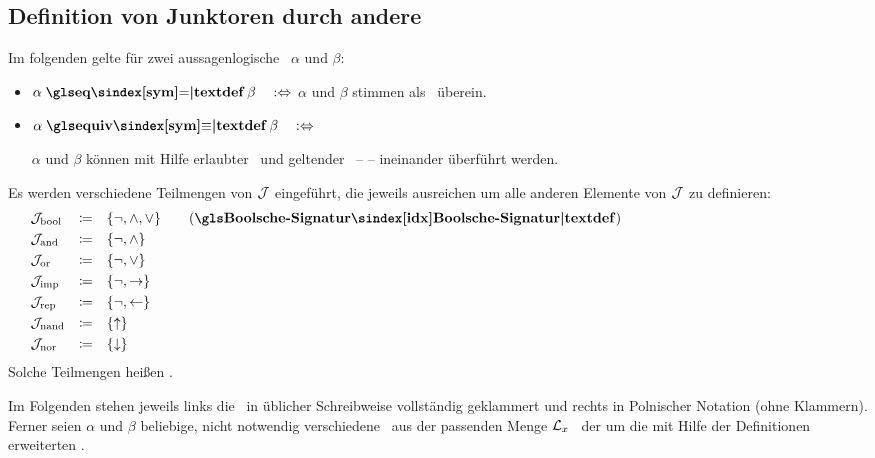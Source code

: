 \subsection{Definition von Junktoren durch andere}%
\label{sub:ausJunktorDef}

Im folgenden gelte für zwei aussagenlogische \Formeln\ $\alpha$ und $\beta$:
\begin{itemize}
	\item[] $\alpha \opdefinition{\symeq}    \beta \quad \metadefeq$ \quad $\alpha$ und $\beta$
	stimmen als \Zeichenkette\ überein.
	\item[] $\alpha \opdefinition{\symequiv} \beta \quad \metadefeq$ \quad
	\parbox[t]{13cm}{$\alpha$ und $\beta$ können mit Hilfe erlaubter \Substitutionen\ und geltender \Axiome\ --  -- ineinander überführt werden.}
\end{itemize}

Es werden verschiedene Teilmengen von $\mathcal{J}$ eingeführt, die jeweils ausreichen um alle anderen Elemente von $\mathcal{J}$ zu definieren:
\begin{align}
	& \alJun_\iBool & \defeq \quad & \{ \lnot, \land, \lor \} \label{def:Jbool}
	\qquad \text{(\definition{\BoolscheSignatur})}
	\\
	& \alJun_\iAnd  & \defeq \quad & \{ \lnot, \land       \} \label{def:Jand}
	\\
	& \alJun_\iOr   & \defeq \quad & \{ \lnot, \lor        \} \label{def:Jor}
	\\
	& \alJun_\iImp  & \defeq \quad & \{ \lnot, \limp       \} \label{def:Jimp}
	\\
	& \alJun_\iRep  & \defeq \quad & \{ \lnot, \lrep       \} \label{def:Jrep}
	\\
	& \alJun_\iNand & \defeq \quad & \{ \lnand             \} \label{def:Jnand}
	\\
	& \alJun_\iNor  & \defeq \quad & \{ \lnor              \} \label{def:Jnor}
	\formulatoleft\formulatoleft\formulatoleft
\end{align}
Solche Teilmengen heißen \logischeSignatur.

Im Folgenden stehen jeweils links die \Formeln\ in üblicher Schreibweise vollständig geklammert und rechts in Polnischer Notation (ohne Klammern).
Ferner seien $\alpha$ und $\beta$ beliebige, nicht notwendig verschiedene \Formeln\ aus der passenden Menge $\mathcal{L}_x$ \textbzgl\ der um die mit Hilfe der Definitionen erweiterten \Formelmenge.


